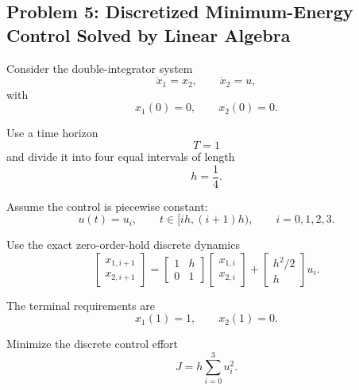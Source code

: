 \subsection*{Problem 5: Discretized Minimum-Energy Control Solved by Linear Algebra}

Consider the double-integrator system
\begin{equation}
\dot{x}_1=x_2,
\qquad
\dot{x}_2=u,
\end{equation}
with
\begin{equation}
x_1(0)=0,
\qquad
x_2(0)=0.
\end{equation}

Use a time horizon
\begin{equation}
T=1
\end{equation}
and divide it into four equal intervals of length
\begin{equation}
h=\frac{1}{4}.
\end{equation}

Assume the control is piecewise constant:
\begin{equation}
u(t)=u_i,
\qquad
t\in[ih,(i+1)h),
\qquad
i=0,1,2,3.
\end{equation}

Use the exact zero-order-hold discrete dynamics
\begin{equation}
\begin{bmatrix}
x_{1,i+1}\\
x_{2,i+1}
\end{bmatrix}
=
\begin{bmatrix}
1&h\\
0&1
\end{bmatrix}
\begin{bmatrix}
x_{1,i}\\
x_{2,i}
\end{bmatrix}
+
\begin{bmatrix}
h^2/2\\
h
\end{bmatrix}
u_i.
\end{equation}

The terminal requirements are
\begin{equation}
x_1(1)=1,
\qquad
x_2(1)=0.
\end{equation}

Minimize the discrete control effort
\begin{equation}
J
=
h\sum_{i=0}^{3}u_i^2.
\end{equation}

